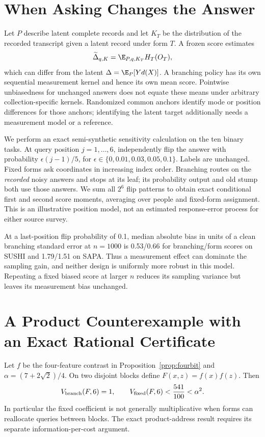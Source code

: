 \section{When Asking Changes the Answer}\label{app:measurement}
Let $P$ describe latent complete records and let $K_T$ be the distribution
of the recorded transcript given a latent record under form $T$. A frozen
score estimates
\[
 \widetilde\Delta_{q,K}
   =\E_{P,q,K_T}H_T(O_T),
\]
which can differ from the latent $\Delta=\E_P[Yd(X)]$. A branching policy
has its own sequential measurement kernel and hence its own mean score.
Pointwise unbiasedness for unchanged answers does not equate these means
under arbitrary collection-specific kernels. Randomized common anchors
identify mode or position differences for those anchors; identifying the
latent target additionally needs a measurement model or a reference.

We perform an exact semi-synthetic sensitivity calculation on the ten
binary tasks. At query position $j=1,\ldots,6$, independently flip the
answer with probability $\epsilon(j-1)/5$, for
$\epsilon\in\{0,0.01,0.03,0.05,0.1\}$. Labels are unchanged. Fixed forms
ask coordinates in increasing index order. Branching routes on the
\emph{recorded} noisy answers and stops at its leaf; its probability output
and old stump both use those answers. We sum all $2^6$ flip patterns to
obtain exact conditional first and second score moments, averaging over
people and fixed-form assignment. This is an illustrative position model,
not an estimated response-error process for either source survey.



At a last-position flip probability of 0.1, median absolute bias in units
of a clean branching standard error at $n=1000$ is 0.53/0.66 for
branching/form scores on SUSHI and 1.79/1.51 on SAPA. Thus a measurement
effect can dominate the sampling gain, and neither design is uniformly
more robust in this model. Repeating a fixed biased score at larger $n$
reduces its sampling variance but leaves its measurement bias unchanged.

\section{A Product Counterexample with an Exact Rational Certificate}
\label{app:nonmultiplicative}
Let $f$ be the four-feature contrast in Proposition~\ref{prop:fourbit} and
$\alpha=(7+2\sqrt2)/4$. On two disjoint blocks define $F(x,z)=f(x)f(z)$.
Then
\[
 V_{\rm branch}(F,6)=1,\qquad
 V_{\rm fixed}(F,6)<\frac{541}{100}<\alpha^2.
\]
In particular the fixed coefficient is not generally multiplicative when
forms can reallocate queries between blocks. The exact product-address
result requires its separate information-per-cost argument.

